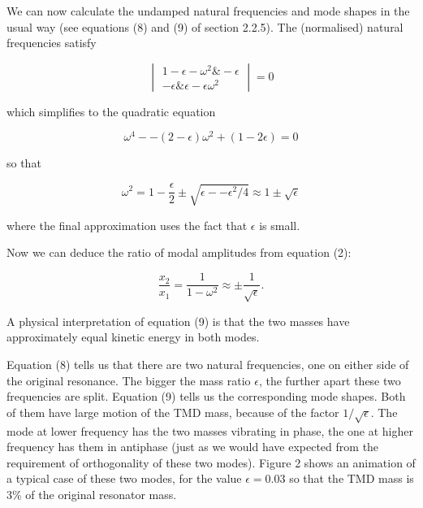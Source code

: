   We can now calculate the undamped natural frequencies and mode shapes in the 
  usual way (see equations (8) and (9) of section 2.2.5). The (normalised) 
  natural frequencies satisfy 

  \begin{equation*}\begin{vmatrix}1-\epsilon-\omega^2 \& -\epsilon \\ -\epsilon 
  \& \epsilon-\epsilon \omega^2\end{vmatrix} =0 \tag{6}\end{equation*} 

  \noindent{}which simplifies to the quadratic equation 

  \begin{equation*}\omega^4 -- (2-\epsilon) \omega^2 + (1-2\epsilon) = 0 
  \tag{7}\end{equation*} 

  \noindent{}so that 

  \begin{equation*}\omega^2 = 1 -\dfrac{\epsilon}{2} \pm \sqrt{\epsilon -- 
  \epsilon^2 /4} \approx 1 \pm \sqrt{\epsilon} \tag{8}\end{equation*} 

  \noindent{}where the final approximation uses the fact that $\epsilon$ is 
  small. 

  Now we can deduce the ratio of modal amplitudes from equation (2): 

  \begin{equation*}\dfrac{x_2}{x_1} = \dfrac{1}{1-\omega^2} \approx \pm 
  \dfrac{1}{\sqrt{\epsilon}} . \tag{9}\end{equation*} 

  A physical interpretation of equation (9) is that the two masses have 
  approximately equal kinetic energy in both modes. 

  Equation (8) tells us that there are two natural frequencies, one on either 
  side of the original resonance. The bigger the mass ratio $\epsilon$, the 
  further apart these two frequencies are split. Equation (9) tells us the 
  corresponding mode shapes. Both of them have large motion of the TMD mass, 
  because of the factor $1/\sqrt{\epsilon}$. The mode at lower frequency has 
  the two masses vibrating in phase, the one at higher frequency has them in 
  antiphase (just as we would have expected from the requirement of 
  orthogonality of these two modes). Figure 2 shows an animation of a typical 
  case of these two modes, for the value $\epsilon = 0.03$ so that the TMD mass 
  is 3\% of the original resonator mass. 

